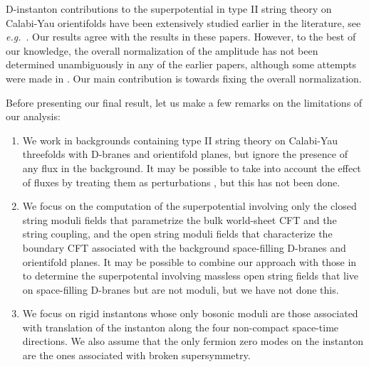 \documentclass[12pt,a4paper]{article}
\begin{document}
D-instanton contributions to the superpotential in type II string theory on Calabi-Yau orientifolds have
been extensively studied earlier in the literature, see {\it e.g.}~\cite{Witten:1996bn,Harvey:1999as,Abel:2006yk,Akerblom:2006hx,Blumenhagen:2006xt,
Ibanez:2006da,Akerblom:2007uc,Cvetic:2007ku,Billo:2007py,Blumenhagen:2009qh,Schmidt-Sommerfeld:2009ere,Grimm:2011dj,Bianchi:2011qh,Kerstan:2012cy,Cvetic:2012ts}.
Our results agree with the results in these papers. However, to the best of
our knowledge, the overall normalization of the amplitude has not been determined unambiguously
in any of the earlier papers, although some attempts were made in \cite{Blumenhagen:2006xt}.
Our main contribution is towards fixing the overall normalization.

Before presenting our final result, let us make a few remarks on the limitations of our analysis:
\begin{enumerate}
\item
We work in backgrounds containing type II string theory on Calabi-Yau threefolds with D-branes
and orientifold planes, but ignore the presence of any flux in the background. It may be possible to take into
account the effect of fluxes by treating them as
perturbations \cite{Billo:2008pg,Billo:2008sp,Cho:2018nfn},
but this has not been done.

\item
We focus on the computation of the superpotential involving only the
closed string moduli fields that parametrize the bulk world-sheet CFT and the string
coupling, and the open string moduli fields that characterize the boundary CFT associated
with the background space-filling D-branes and orientifold planes. It
may be possible to combine our approach with those in \cite{Blumenhagen:2006xt,Akerblom:2007uc,
Cvetic:2007ku,Blumenhagen:2009qh} to determine the superpotental involving
massless open string fields that live on space-filling D-branes but are not moduli,
but we have not done this.

\item
We focus on rigid instantons whose only bosonic moduli are those associated with translation
of the instanton along the four non-compact space-time directions. We also assume that the only fermion
zero modes on the instanton are the ones associated with broken supersymmetry.
\end{enumerate}
\end{document}
